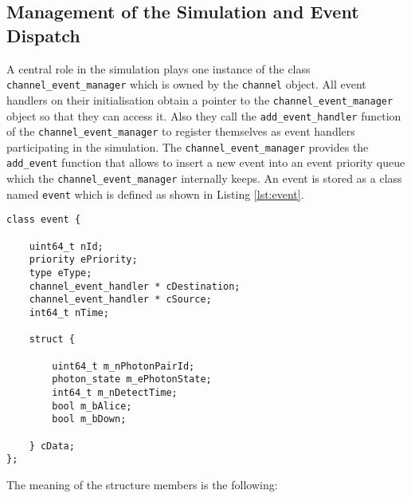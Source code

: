 \subsection{Management of the Simulation and Event Dispatch}
\label{subsec:concepts_events}

A central role in the simulation plays one instance of the class \texttt{channel\_event\_manager} which is owned by the \texttt{channel} object. All event handlers on their initialisation obtain a pointer to the \texttt{channel\_event\_manager} object so that they can access it. Also they call the \texttt{add\_event\_handler} function of the \texttt{channel\_event\_manager} to register themselves as event handlers participating in the simulation. The \texttt{channel\_event\_manager} provides the \texttt{add\_event} function that allows to insert a new event into an event priority queue which the \texttt{channel\_event\_manager} internally keeps. An event is stored as a class named \texttt{event} which is defined as shown in Listing \ref{lst:event}.

\begin{lstlisting}[caption={Definition of the \texttt{event} class}, captionpos=b, label={lst:event}]
class event {

    uint64_t nId;
    priority ePriority;
    type eType;
    channel_event_handler * cDestination;
    channel_event_handler * cSource;
    int64_t nTime;
    
    struct {
        
        uint64_t m_nPhotonPairId;
        photon_state m_ePhotonState;
        int64_t m_nDetectTime;
        bool m_bAlice;
        bool m_bDown;
        
    } cData;
};
\end{lstlisting}

The meaning of the structure members is the following:

